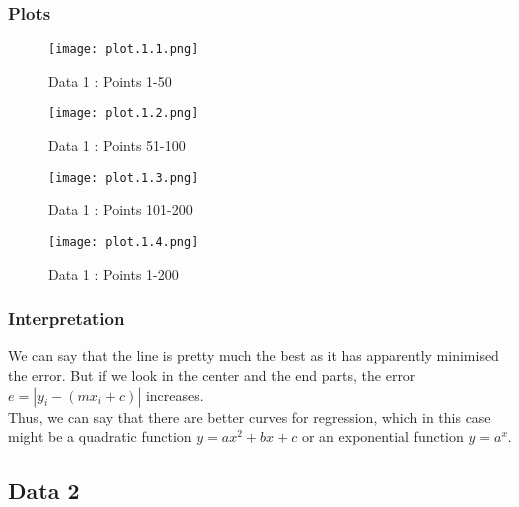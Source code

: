 \documentclass[12pt]{article}
\begin{document}
        \subsubsection{Plots}
            \begin{figure}[H]
                \centering
                \texttt{[image: plot.1.1.png]}
                \caption{Data 1 : Points 1-50}
                \label{fig:1.1}
            \end{figure}
            \begin{figure}[H]
                \centering
                \texttt{[image: plot.1.2.png]}
                \caption{Data 1 : Points 51-100}
                \label{fig:1.2}
            \end{figure}
            \begin{figure}[H]
                \centering
                \texttt{[image: plot.1.3.png]}
                \caption{Data 1 : Points 101-200}
                \label{fig:1.3}
            \end{figure}
            \begin{figure}[H]
                \centering
                \texttt{[image: plot.1.4.png]}
                \caption{Data 1 : Points 1-200}
                \label{fig:1.4}
            \end{figure}
            
        \subsubsection{Interpretation}
                We can say that the line is pretty much the best as it has apparently minimised the error. But if we look in the center and the end parts, the error $e=|y_i - (mx_i + c)|$ increases.\\
                Thus, we can say that there are better curves for regression, which in this case might be a quadratic function $y=ax^2+bx+c$ or an exponential function $y=a^x$.
    \newpage
                
    \subsection{Data 2}
\end{document}

